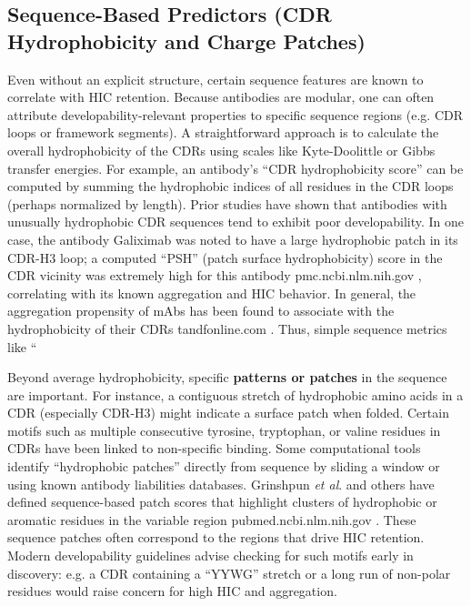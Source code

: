 \documentclass[12pt]{article}
\begin{document}
\subsection{Sequence-Based Predictors (CDR Hydrophobicity and Charge Patches)}
Even without an explicit structure, certain sequence features are known to correlate with HIC retention. Because antibodies are modular, one can often attribute developability-relevant properties to specific sequence regions (e.g. CDR loops or framework segments). A straightforward approach is to calculate the overall hydrophobicity of the CDRs using scales like Kyte-Doolittle or Gibbs transfer energies. For example, an antibody’s “CDR hydrophobicity score” can be computed by summing the hydrophobic indices of all residues in the CDR loops (perhaps normalized by length). Prior studies have shown that antibodies with unusually hydrophobic CDR sequences tend to exhibit poor developability. In one case, the antibody Galiximab was noted to have a large hydrophobic patch in its CDR-H3 loop; a computed “PSH” (patch surface hydrophobicity) score in the CDR vicinity was extremely high for this antibody
pmc.ncbi.nlm.nih.gov
, correlating with its known aggregation and HIC behavior. In general, the aggregation propensity of mAbs has been found to associate with the hydrophobicity of their CDRs
tandfonline.com
. Thus, simple sequence metrics like “%

Beyond average hydrophobicity, specific \textbf{patterns or patches} in the sequence are important. For instance, a contiguous stretch of hydrophobic amino acids in a CDR (especially CDR-H3) might indicate a surface patch when folded. Certain motifs such as multiple consecutive tyrosine, tryptophan, or valine residues in CDRs have been linked to non-specific binding. Some computational tools identify “hydrophobic patches” directly from sequence by sliding a window or using known antibody liabilities databases. Grinshpun \textit{et al}. and others have defined sequence-based patch scores that highlight clusters of hydrophobic or aromatic residues in the variable region
pubmed.ncbi.nlm.nih.gov
. These sequence patches often correspond to the regions that drive HIC retention. Modern developability guidelines advise checking for such motifs early in discovery: e.g. a CDR containing a “YYWG” stretch or a long run of non-polar residues would raise concern for high HIC and aggregation.
\end{document}
